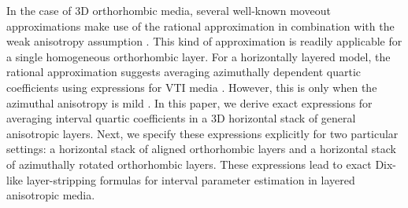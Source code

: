 In the case of 3D orthorhombic media, several well-known moveout approximations make use of the rational approximation \cite[]{alortho} in combination with the weak anisotropy assumption \cite[]{pech2004,xu,vascon,grechkapech,fpj}. This kind of approximation is readily applicable for a single homogeneous orthorhombic layer. For a horizontally layered model, the rational approximation suggests averaging azimuthally dependent  quartic coefficients using expressions for VTI media \cite[]{hake,tsvankinthomsen1994,tsvankinbook}. However, this is  only when the azimuthal anisotropy is mild \cite[]{alortho,vascon}. In this paper, we derive exact expressions for averaging interval quartic coefficients in a 3D horizontal stack of general anisotropic layers. Next, we specify these expressions explicitly for two particular settings: a horizontal stack of  aligned orthorhombic layers and a horizontal stack of azimuthally rotated orthorhombic layers. These expressions lead to exact Dix-like layer-stripping formulas for interval parameter estimation in layered anisotropic media.

